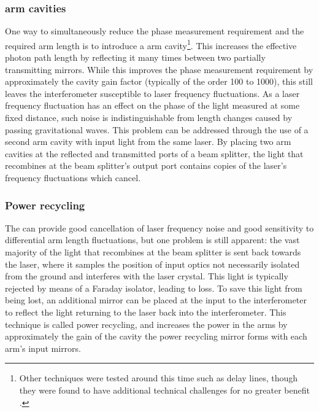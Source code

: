 
\subsubsection{\label{sec:fabry-perot-cavities}\FP{} arm cavities}
One way to simultaneously reduce the phase measurement requirement and the required arm length is to introduce a \FP{} arm cavity\footnote{Other techniques were tested around this time such as delay lines, though they were found to have additional technical challenges for no greater benefit .}. This increases the effective photon path length by reflecting it many times between two partially transmitting mirrors. While this improves the phase measurement requirement by approximately the cavity gain factor (typically of the order \num{100} to \num{1000}), this still leaves the interferometer susceptible to laser frequency fluctuations. As a laser frequency fluctuation has an effect on the phase of the light measured at some fixed distance, such noise is indistinguishable from length changes caused by passing gravitational waves. This problem can be addressed through the use of a second \FP{} arm cavity with input light from the same laser. By placing two arm cavities at the reflected and transmitted ports of a beam splitter, the light that recombines at the beam splitter's output port contains  copies of the laser's frequency fluctuations which cancel.

\subsubsection{\label{sec:power-recycling}Power recycling}
The \FPMI{} can provide good cancellation of laser frequency noise and good sensitivity to differential arm length fluctuations, but one problem is still apparent: the vast majority of the light that recombines at the beam splitter is sent back towards the laser, where it samples the position of input optics not necessarily isolated from the ground and interferes with the laser crystal. This light is typically rejected by means of a Faraday isolator, leading to loss. To save this light from being lost, an additional mirror can be placed at the input to the interferometer to reflect the light returning to the laser back into the interferometer. This technique is called power recycling, and increases the power in the arms by approximately the gain of the cavity the power recycling mirror forms with each arm's input mirrors.

